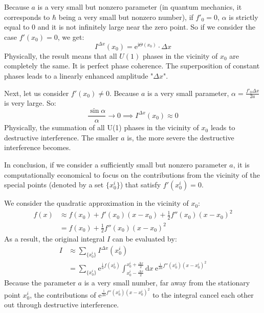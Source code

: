 Because $a$ is a very small but nonzero parameter (in quantum mechanics, it corresponds to $\hbar$ being a very small but nonzero number),
if $f'_0=0$, $\alpha$ is strictly equal to 0 and it is not infinitely large near the zero point. 
So if we consider the case $f'(x_0)=0$, we get:
\begin{equation}
I^{\Delta x}(x_0) = \mathrm{e}^{\mathrm{i}\Theta(x_0)} \cdot \Delta x
\end{equation}
Physically, the result means that all $U(1)$ phases in the vicinity of $x_0$ are completely the same.
It is perfect phase coherence. The superposition of constant phases leads to a linearly enhanced amplitude "$\Delta x$".

Next, let us consider $f'(x_0) \neq 0$. Because $a$ is a very small parameter, $\alpha = \frac{f'_0 \Delta x}{2a}$ is very large. So:
\begin{equation}
\frac{\sin\alpha}{\alpha} \rightarrow 0 \implies I^{\Delta x}(x_0) \approx 0
\end{equation}
Physically, the summation of all U(1) phases in the vicinity of $x_0$ leads to destructive interference. 
The smaller $a$ is, the more severe the destructive interference becomes.

In conclusion, if we consider a sufficiently small but nonzero parameter $a$,
it is computationally economical to focus on the contributions from the vicinity of the special points (denoted by a set $\{x_0^i\}$) that satisfy $f'(x_0^i)=0$.

\begin{center}

\end{center}

We consider the quadratic approximation in the vicinity of $x_0$:
\begin{equation}
\begin{aligned}
f(x) &\approx f(x_0) + f'(x_0)(x-x_0) + \frac{1}{2} f''(x_0)(x-x_0)^2 \\
&= f(x_0) + \frac{1}{2} f''(x_0)(x-x_0)^2
\end{aligned}
\end{equation}
As a result, the original integral $I$ can be evaluated by:
\begin{equation}
\begin{aligned}
I &\approx \sum_{\{x_0^i\}} I^{\Delta x}(x_0^i) \\
&= \sum_{\{x_0^i\}} \mathrm{e}^{\frac{\mathrm{i}}{a} f(x_0^i)} \int_{x_0^i-\frac{\Delta x}{2}}^{x_0^i+\frac{\Delta x}{2}} \mathrm{d}x \ \mathrm{e}^{\frac{\mathrm{i}}{2a} f''(x_0^i)(x-x_0^i)^2}
\end{aligned}
\end{equation}
Because the parameter $a$ is a very small number, far away from the stationary point $x_0^i$,
the contributions of $\mathrm{e}^{\frac{\mathrm{i}}{2a} f''(x_0^i)(x-x_0^i)^2}$ to the integral cancel each other out through destructive interference.

